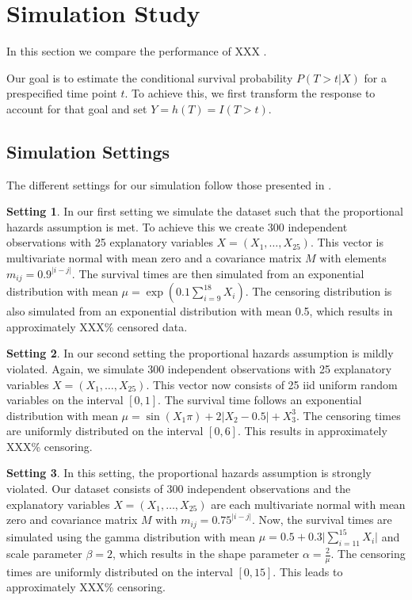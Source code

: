 \documentclass[12pt, a4paper]{article}
\theoremstyle{definition}
\newtheorem{setting}{Setting}
\theoremstyle{plain}
\numberwithin{equation}{section}
\numberwithin{figure}{section}
\numberwithin{table}{section}
\begin{document}
	\newpage

	\section{Simulation Study} \label{simulation}
	In this section we compare the performance of XXX
	.
	
		
	Our goal is to estimate the conditional survival probability $P(T>t\vert X)$ for a prespecified time point $t$.
	To achieve this, we first transform the response to account for that goal and set $Y=h(T)=I(T>t)$.
	
	\subsection{Simulation Settings}

	The different settings for our simulation follow those presented in \citet*{culs}.
	
	\begin{setting}
		In our first setting we simulate the dataset such that the proportional hazards assumption is met.
		To achieve this we create 300 independent observations with 25 explanatory variables $X=(X_1,\dots,X_{25})$.
		This vector is multivariate normal with mean zero and a covariance matrix $M$ with elements $m_{ij}=0.9^{\vert i-j\vert}$.
		The survival times are then simulated from an exponential distribution with mean $\mu = \exp\left(0.1\sum_{i=9}^{18}X_i\right)$.
		The censoring distribution is also simulated from an exponential distribution with mean 0.5, which results in approximately XXX\% censored data.
	\end{setting}

	\begin{setting}		
		In our second setting the proportional hazards assumption is mildly violated.
		Again, we simulate 300 independent observations with 25 explanatory variables $X=(X_1,\dots, X_{25})$.
		This vector now consists of 25 iid uniform random variables on the interval $[0,1]$.
		The survival time follows an exponential distribution with mean $\mu = \sin(X_1\pi)+2\vert X_2-0.5\vert + X_3^3$.
		The censoring times are uniformly distributed on the interval $[0,6]$.
		This results in approximately XXX\% censoring.
	\end{setting}
		
	\begin{setting}
		In this setting, the proportional hazards assumption is strongly violated.
		Our dataset consists of 300 independent observations and the explanatory variables $X=(X_1,\dots,X_{25})$ are each multivariate normal with mean zero and covariance matrix $M$ with $m_{ij}=0.75^{\vert i-j\vert}$.
		Now, the survival times are simulated using the gamma distribution with  mean $\mu = 0.5 + 0.3 \vert \sum_{i=11}^{15} X_i \vert$ and scale parameter $\beta = 2$, which results in the shape parameter $\alpha = \frac{2}{\mu}$.
		The censoring times are uniformly distributed on the interval $[0,15]$.
		This leads to approximately XXX\% censoring.
	\end{setting}
\end{document}
